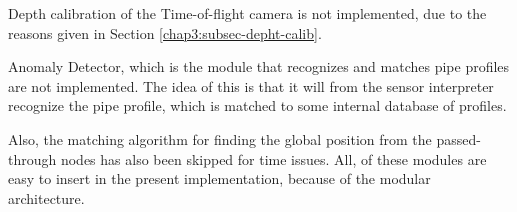 Depth calibration of the Time-of-flight camera is not implemented, due to the reasons
given in Section \ref{chap3:subsec-depht-calib}.

Anomaly Detector, which is the module that recognizes and matches pipe profiles are not implemented. 
The idea of this is that it will from the sensor interpreter recognize the pipe
profile, which is matched to some internal database of profiles.

Also, the matching algorithm for finding the global position from the passed-through nodes
has also been skipped for time issues. All, of these modules are easy to insert in the
present implementation, because of the modular architecture. 


